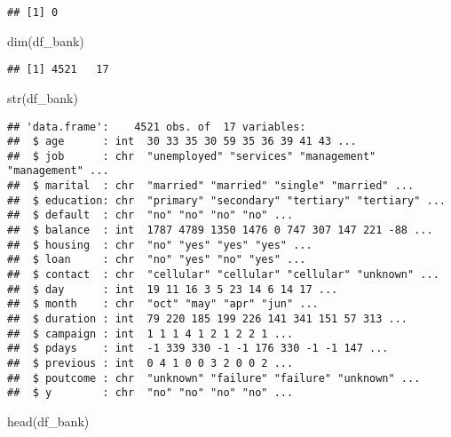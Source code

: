 \documentclass[
]{article}
\newenvironment{Shaded}{\begin{snugshade}}{\end{snugshade}}
\newcommand{\FunctionTok}[1]{\textcolor[rgb]{0.00,0.00,0.00}{#1}}
\newcommand{\NormalTok}[1]{#1}
\begin{document}
\begin{verbatim}
## [1] 0
\end{verbatim}

\begin{Shaded}
\begin{Highlighting}[]
\FunctionTok{dim}\NormalTok{(df\_bank)}
\end{Highlighting}
\end{Shaded}

\begin{verbatim}
## [1] 4521   17
\end{verbatim}

\begin{Shaded}
\begin{Highlighting}[]
\FunctionTok{str}\NormalTok{(df\_bank)}
\end{Highlighting}
\end{Shaded}

\begin{verbatim}
## 'data.frame':    4521 obs. of  17 variables:
##  $ age      : int  30 33 35 30 59 35 36 39 41 43 ...
##  $ job      : chr  "unemployed" "services" "management" "management" ...
##  $ marital  : chr  "married" "married" "single" "married" ...
##  $ education: chr  "primary" "secondary" "tertiary" "tertiary" ...
##  $ default  : chr  "no" "no" "no" "no" ...
##  $ balance  : int  1787 4789 1350 1476 0 747 307 147 221 -88 ...
##  $ housing  : chr  "no" "yes" "yes" "yes" ...
##  $ loan     : chr  "no" "yes" "no" "yes" ...
##  $ contact  : chr  "cellular" "cellular" "cellular" "unknown" ...
##  $ day      : int  19 11 16 3 5 23 14 6 14 17 ...
##  $ month    : chr  "oct" "may" "apr" "jun" ...
##  $ duration : int  79 220 185 199 226 141 341 151 57 313 ...
##  $ campaign : int  1 1 1 4 1 2 1 2 2 1 ...
##  $ pdays    : int  -1 339 330 -1 -1 176 330 -1 -1 147 ...
##  $ previous : int  0 4 1 0 0 3 2 0 0 2 ...
##  $ poutcome : chr  "unknown" "failure" "failure" "unknown" ...
##  $ y        : chr  "no" "no" "no" "no" ...
\end{verbatim}

\begin{Shaded}
\begin{Highlighting}[]
\FunctionTok{head}\NormalTok{(df\_bank)}
\end{Highlighting}
\end{Shaded}
\end{document}
